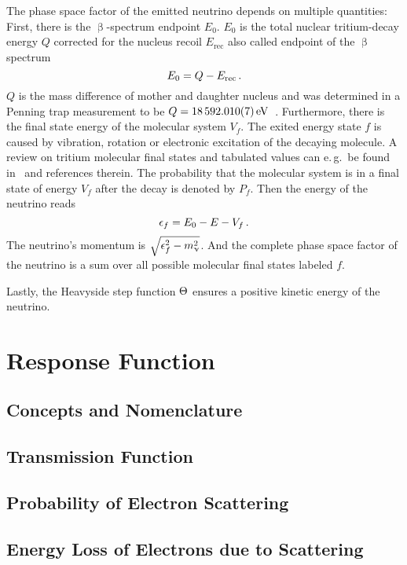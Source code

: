 The phase space factor of the emitted neutrino  depends on multiple quantities: First, there is the $\upbeta$-spectrum endpoint $E_0$. $E_0$ is the total nuclear tritium-decay energy $Q$ corrected for the nucleus recoil $E_\mathrm{rec}$ also called endpoint of the $\upbeta$ spectrum
\begin{equation}
\label{eq:intSpecModelEndpoint}
E_0 = Q-E_\mathrm{rec}
\text{\,.}
\end{equation}
$Q$ is the mass difference of mother and daughter nucleus and was determined in a Penning trap measurement to be $Q=\SI{18592.01\pm0.007}{eV}$~\cite{Myers2015}. Furthermore, there is the final state energy of the molecular system $V_f$. The exited energy state $f$ is caused by vibration, rotation or electronic excitation of the decaying molecule. A review on tritium molecular final states and tabulated values can e.\,g.~be found in~\cite{Bodine2015} and references therein.  The probability that the molecular system is in a final state of energy $V_f$ after the decay is denoted by $P_f$. Then the energy of the neutrino reads 
\begin{equation}
\epsilon_f = E_0 - E - V_f 
\text{\,.}
\end{equation}
The neutrino's momentum is $\sqrt{\epsilon_f^2-m_\upnu^2}$. And the complete phase space factor of the neutrino is a sum over all possible molecular final states labeled $f$.

Lastly, the Heavyside step function $\Theta$ ensures a positive kinetic energy of the neutrino.

\section{Response Function}
\subsection{Concepts and Nomenclature}
\subsection{Transmission Function}
\subsection{Probability of Electron Scattering}
\subsection{Energy Loss of Electrons due to Scattering}


